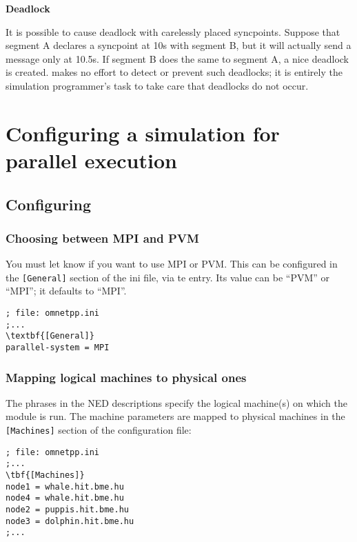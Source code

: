 \textbf{Deadlock}


It is possible to cause deadlock
with carelessly placed syncpoints.  Suppose that segment A declares a
syncpoint at 10s with segment B, but it will actually send a message
only at 10.5s. If segment B does the same to segment A, a nice
deadlock is created. {\opp} makes no effort to detect or prevent such
deadlocks; it is entirely the simulation programmer's task to take
care that deadlocks do not occur.




\section{Configuring a simulation for parallel execution}

\subsection{Configuring {\opp}}

\subsubsection{Choosing between MPI and PVM}


You must let {\opp} know if you want to use MPI or
PVM. This can be configured in the \texttt{[General]}
section of the ini file, via te
 entry. Its value can be
``PVM'' or ``MPI''; it defaults to ``MPI''.

\begin{Verbatim}[commandchars=\\\{\}]
; file: omnetpp.ini
;...
\textbf{[General]}
parallel-system = MPI
\end{Verbatim}


\subsubsection{Mapping logical machines to physical ones}
\label{sec:ch-parallel-exec:machine-mapping}

The  phrases in the NED descriptions
specify the logical machine(s) on which the module is run. The machine
parameters are mapped to physical machines in the \texttt{[Machines]}
section of the configuration file:

\begin{Verbatim}[commandchars=\\\{\}]
; file: omnetpp.ini
;...
\tbf{[Machines]}
node1 = whale.hit.bme.hu
node4 = whale.hit.bme.hu
node2 = puppis.hit.bme.hu
node3 = dolphin.hit.bme.hu
;...
\end{Verbatim}


